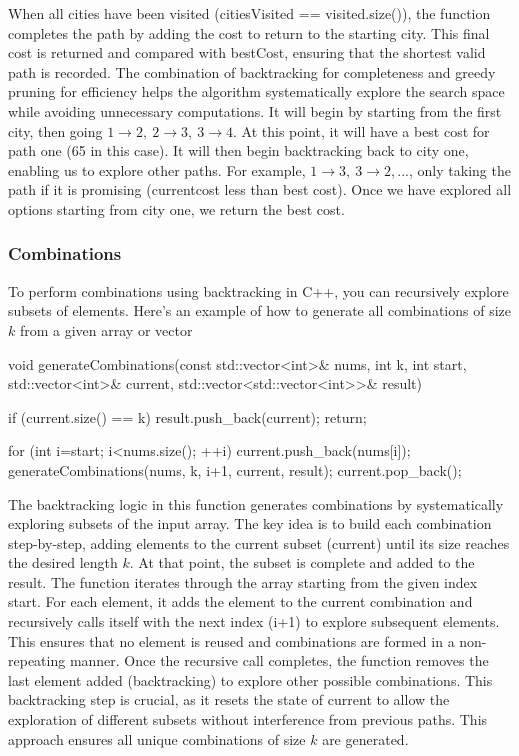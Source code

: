 \documentclass{report}
\begin{document}
\bigbreak \noindent 
When all cities have been visited (citiesVisited == visited.size()), the function completes the path by adding the cost to return to the starting city. This final cost is returned and compared with bestCost, ensuring that the shortest valid path is recorded. The combination of backtracking for completeness and greedy pruning for efficiency helps the algorithm systematically explore the search space while avoiding unnecessary computations.
\bigbreak \noindent 
It will begin by starting from the first city, then going $1 \to 2,\ 2 \to 3,\ 3 \to 4$. At this point, it will have a best cost for path one (65 in this case). It will then begin backtracking back to city one, enabling us to explore other paths. For example, $1 \to 3,\ 3 \to 2, ...$, only taking the path if it is promising (currentcost less than best cost). Once we have explored all options starting from city one, we return the best cost.

\pagebreak 
\subsubsection{Combinations}
\bigbreak \noindent 
To perform combinations using backtracking in C++, you can recursively explore subsets of elements. Here’s an example of how to generate all combinations of size $k$ from a given array or vector
\bigbreak \noindent 
\begin{cppcode}
    void generateCombinations(const std::vector<int>& nums, int k, int start, std::vector<int>& current, std::vector<std::vector<int>>& result) {
        if (current.size() == k) {
            result.push_back(current);
            return;
        }

        for (int i=start; i<nums.size(); ++i) {
            current.push_back(nums[i]);
            generateCombinations(nums, k, i+1, current, result);
            current.pop_back();
        }
    }
\end{cppcode}
\bigbreak \noindent 
The backtracking logic in this function generates combinations by systematically exploring subsets of the input array. The key idea is to build each combination step-by-step, adding elements to the current subset (current) until its size reaches the desired length $k$. At that point, the subset is complete and added to the result.
\bigbreak \noindent 
The function iterates through the array starting from the given index start. For each element, it adds the element to the current combination and recursively calls itself with the next index (i+1) to explore subsequent elements. This ensures that no element is reused and combinations are formed in a non-repeating manner.
\bigbreak \noindent 
Once the recursive call completes, the function removes the last element added (backtracking) to explore other possible combinations. This backtracking step is crucial, as it resets the state of current to allow the exploration of different subsets without interference from previous paths. This approach ensures all unique combinations of size $k$ are generated.
\end{document}
